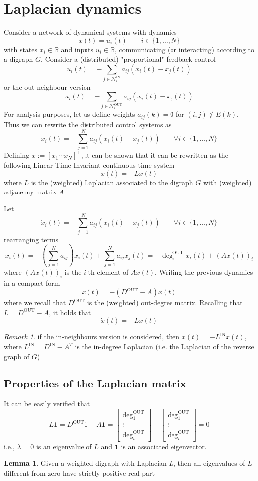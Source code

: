 \documentclass{book}
\newcommand{\R}{\mathbb{R}}
\theoremstyle{theoremv2}
\theoremstyle{defv2}
\theoremstyle{remark}
\newtheorem*{remark}{Remark}
\theoremstyle{remark}
\theoremstyle{definition}
\newtheorem*{lemma}{Lemma}
\theoremstyle{definition}
\begin{document}
\section{Laplacian dynamics}
Consider a network of dynamical systems with dynamics 
\[
    \dot{x}(t) = u_i(t) \qquad i \in \{1,\dots,N\}
\]
with states $x_i\in\R$ and inputs $u_i\in\R$, communicating (or interacting) according to a digraph $G$. Consider a (distributed) "proportional" feedback control 
\[
    u_i(t) = - \displaystyle\sum_{j\in\mathcal{N}_i^{\text{IN}}}a_{ij}(x_i(t)-x_j(t))
\]
or the out-neighbour version
\[
    u_i(t) = - \displaystyle\sum_{j\in\mathcal{N}_i^{\text{OUT}}}a_{ij}(x_i(t)-x_j(t))
\]
For analysis purposes, let us define weights $a_{ij}(k)=0$ for $(i,j)\notin E(k)$. Thus we can rewrite the distributed control systems as 
\[
    \dot{x}_i(t) = - \displaystyle\sum_{j=1}^{N} a_{ij} (x_i(t)-x_j(t)) \qquad \forall i\in\{1,\dots,N\}
\]
Defining $x:=[x_1 \cdots x_N]^\top$, it can be shown that it can be rewritten as the following Linear Time Invariant continuous-time system 
\[
    \dot{x}(t) = -Lx(t)
\]
where $L$ is the (weighted) Laplacian associated to the digraph $G$ with (weighted) adjacency matrix $A$ 

Let 
\[
    \dot{x}_i(t) = - \displaystyle\sum_{j=1}^{N} a_{ij} (x_i(t)-x_j(t)) \qquad \forall i\in\{1,\dots,N\}
\]
rearranging terms 
\[
    \dot{x}_i(t) = -\left(\displaystyle\sum_{j=1}^{N} a_{ij}\right) x_i(t) + \displaystyle\sum_{j=1}^{N} a_{ij}x_j(t) = -\deg_i^{\text{OUT}}x_i(t)+ (Ax(t))_i
\]
where $(Ax(t))_i$ is the $i$-th element of $Ax(t)$. Writing the previous dynamics in a compact form 
\[
    \dot{x}(t) = -(D^{\text{OUT}}-A)x(t)
\]
where we recall that $D^{\text{OUT}}$ is the (weighted) out-degree matrix. Recalling that $L=D^{\text{OUT}}-A$, it holds that 
\[
    \dot{x}(t) = -Lx(t)
\]
\begin{remark}
    if the in-neighbours version is considered, then $\dot{x}(t) = -L^{\text{IN}}x(t)$, where $L^{\text{IN}}=D^{\text{IN}}-A^T$ is the in-degree Laplacian (i.e. the Laplacian of the reverse graph of $G$)
\end{remark}
\subsection{Properties of the Laplacian matrix}
It can be easily verified that 
\[
    L\mathbf{1} = D^{\text{OUT}}\mathbf{1}-A\mathbf{1} = \begin{bmatrix}
        \deg_1^{\text{OUT}} \\ \vdots \\ \deg_i^{\text{OUT}}
    \end{bmatrix} - \begin{bmatrix}
        \deg_1^{\text{OUT}} \\ \vdots \\ \deg_i^{\text{OUT}}
    \end{bmatrix} = 0
\]
i.e., $\lambda=0$ is an eigenvalue of $L$ and $\mathbf{1}$ is an associated eigenvector.
\begin{lemma}
    Given a weighted digraph with Laplacian $L$, then all eigenvalues of $L$ different from zero have strictly positive real part
\end{lemma}
\end{document}
